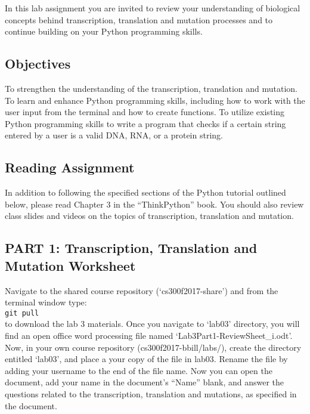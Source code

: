 

\long{}



In this lab assignment you are invited to review your understanding of  biological concepts behind transcription, translation and mutation processes and to continue building on your Python programming skills.

\subsection*{Objectives}
To strengthen the understanding of the transcription, translation and mutation. To learn and enhance Python programming skills, including how to work with the user input from the terminal and how to create functions. To utilize existing Python programming skills to write a program that checks if a certain string entered by a user is a valid DNA, RNA, or a protein string.

\vspace*{-.1in}
\subsection*{Reading Assignment}
\vspace*{-.1in}
In addition to following the specified sections of the Python tutorial outlined below, please read Chapter 3 in the ``ThinkPython'' book. You should also review class slides and videos on the topics of transcription, translation and mutation. 

\vspace*{-.1in}
\subsection*{PART 1: Transcription, Translation and Mutation Worksheet}
\vspace*{-.1in} 
Navigate to the shared course repository (`cs300f2017-share') and from the terminal window type: \\
\color{red} {\tt git pull}  \\
\color{black}
to download the lab 3 materials. Once you navigate to `lab03' directory, you will find an open office word processing file named `Lab3Part1-ReviewSheet\_i.odt'. Now, in your own course repository (cs300f2017-bbill/labs/), create the directory entitled `lab03', and place a your copy of the file in lab03. Rename the file by adding your username to the end of the file name. Now you can open the document, add your name in the document's ``Name'' blank, and answer the questions related to the transcription, translation and mutations, as specified in the document.

